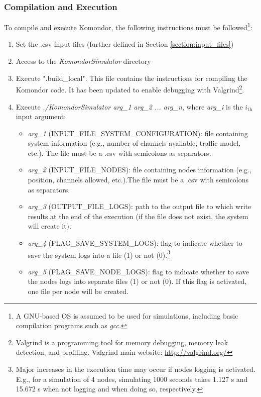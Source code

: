 \documentclass[a4paper]{article}
\begin{document}
		\subsubsection{Compilation and Execution}
		\label{section:compilation_execution}
		To compile and execute Komondor, the following instructions must be followed\footnote{A GNU-based OS is assumed to be used for simulations, including basic compilation programs such as \emph{gcc}.}:
		\begin{enumerate}
			\item Set the .csv input files (further defined in Section \ref{section:input_files})
			\item Access to the \textit{KomondorSimulator} directory
		    \item Execute ".build\_local". This file contains the instructions for compiling the Komondor code. It has been updated to enable debugging with Valgrind\footnote{Valgrind is a programming tool for memory debugging, memory leak detection, and profiling. Valgrind main website: \url{http://valgrind.org/}}.
		    \item Execute \textit{./KomondorSimulator arg\_1 arg\_2 ... arg\_n}, where \textit{arg\_i} is the $i_{\text{th}}$ input argument:
		    	\begin{itemize}		            
		            \item \textit{arg\_1} (INPUT\_FILE\_SYSTEM\_CONFIGURATION): file containing system information (e.g., number of channels available, traffic model, etc.). The file must be a .csv with semicolons as separators.
		            \item \textit{arg\_2} (INPUT\_FILE\_NODES): file containing nodes information (e.g., position, channels allowed, etc.).The file must be a .csv with semicolons as separators.
		            \item \textit{arg\_3} (OUTPUT\_FILE\_LOGS): path to the output file to which write results at the end of the execution (if the file does not exist, the system will create it).
		            \item \textit{arg\_4} (FLAG\_SAVE\_SYSTEM\_LOGS): flag to indicate whether to save the system logs into a file (1) or not (0).\footnote{Major increases in the execution time may occur if nodes logging is activated. E.g., for a simulation of 4 nodes, simulating 1000 seconds takes 1.127 s and 15.672 s when not logging and when doing so, respectively.}
		            \item \textit{arg\_5} (FLAG\_SAVE\_NODE\_LOGS): flag to indicate whether to save the nodes logs into separate files (1) or not (0). If this flag is activated, one file per node will be created.

\end{itemize}
\end{enumerate}
\end{document}

